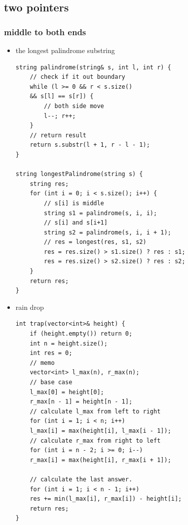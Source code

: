 \documentclass[a4paper,11pt,twoside]{book}
\begin{document}
\subsection{two pointers}


\subsubsection{middle to both ends}
\begin{itemize}
	\item the longest palindrome substring
	
\begin{lstlisting}[breaklines]
string palindrome(string& s, int l, int r) {
	// check if it out boundary
	while (l >= 0 && r < s.size()
	&& s[l] == s[r]) {
		// both side move
		l--; r++;
	}
	// return result
	return s.substr(l + 1, r - l - 1);
}

string longestPalindrome(string s) {
	string res;
	for (int i = 0; i < s.size(); i++) {
		// s[i] is middle
		string s1 = palindrome(s, i, i);
		// s[i] and s[i+1] 
		string s2 = palindrome(s, i, i + 1);
		// res = longest(res, s1, s2)
		res = res.size() > s1.size() ? res : s1;
		res = res.size() > s2.size() ? res : s2;
	}
	return res;
}
\end{lstlisting}
	
	\item rain drop
	
\begin{lstlisting}[breaklines]
int trap(vector<int>& height) {
	if (height.empty()) return 0;
	int n = height.size();
	int res = 0;
	// memo
	vector<int> l_max(n), r_max(n);
	// base case
	l_max[0] = height[0];
	r_max[n - 1] = height[n - 1];
	// calculate l_max from left to right
	for (int i = 1; i < n; i++)
	l_max[i] = max(height[i], l_max[i - 1]);
	// calculate r_max from right to left
	for (int i = n - 2; i >= 0; i--) 
	r_max[i] = max(height[i], r_max[i + 1]);
	
	// calculate the last answer.
	for (int i = 1; i < n - 1; i++) 
	res += min(l_max[i], r_max[i]) - height[i];
	return res;
}
\end{lstlisting}

\end{itemize}
\end{document}
